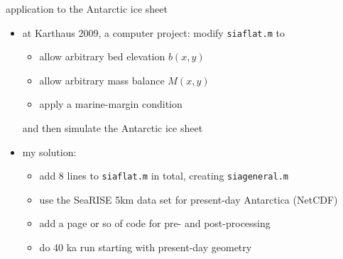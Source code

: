 \begin{frame}{application to the Antarctic ice sheet}
\small
\begin{itemize}
\item at Karthaus 2009, a computer project: modify \texttt{siaflat.m} to
  \begin{itemize}
  \small
  \item allow arbitrary bed elevation $b(x,y)$
  \item allow arbitrary mass balance $M(x,y)$
  \item apply a marine-margin condition
  \end{itemize}
and then simulate the Antarctic ice sheet
\item my solution: 
  \begin{itemize}
  \small
  \item add 8 lines to \texttt{siaflat.m} in total, creating \texttt{siageneral.m}
  \item use the SeaRISE 5km data set for present-day Antarctica (NetCDF)
  \item add a page or so of code for pre- and post-processing
  \item do 40 ka run starting with present-day geometry
  \end{itemize}
\end{itemize}


\end{frame}
